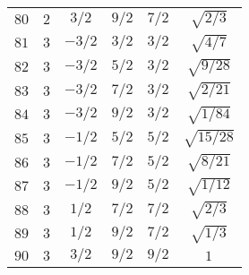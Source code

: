 \begin{table}
\begin{center}
\begin{tabular}{|c|c|c|c|c|c|}
$80$ & $2$ & $3/2$ & $9/2$ & $7/2$ & $\sqrt{2/3}$ \\ 
$81$ & $3$ & $-3/2$ & $3/2$ & $3/2$ & $\sqrt{4/7}$ \\ 
$82$ & $3$ & $-3/2$ & $5/2$ & $3/2$ & $\sqrt{9/28}$ \\ 
$83$ & $3$ & $-3/2$ & $7/2$ & $3/2$ & $\sqrt{2/21}$ \\ 
$84$ & $3$ & $-3/2$ & $9/2$ & $3/2$ & $\sqrt{1/84}$ \\ 
$85$ & $3$ & $-1/2$ & $5/2$ & $5/2$ & $\sqrt{15/28}$ \\ 
$86$ & $3$ & $-1/2$ & $7/2$ & $5/2$ & $\sqrt{8/21}$ \\ 
$87$ & $3$ & $-1/2$ & $9/2$ & $5/2$ & $\sqrt{1/12}$ \\ 
$88$ & $3$ & $1/2$ & $7/2$ & $7/2$ & $\sqrt{2/3}$ \\ 
$89$ & $3$ & $1/2$ & $9/2$ & $7/2$ & $\sqrt{1/3}$ \\ 
$90$ & $3$ & $3/2$ & $9/2$ & $9/2$ & $1$ \\ 
\hline 
\end{tabular}
\end{center}
\end{table}

